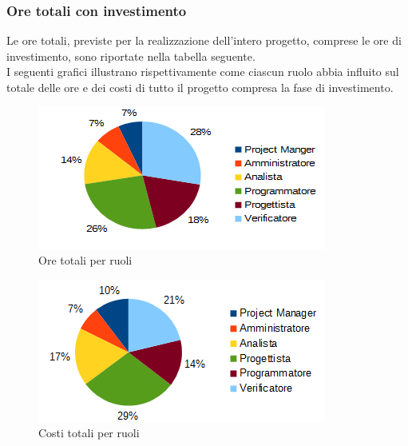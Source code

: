 		\subsubsection{Ore totali con investimento}
		Le ore totali, previste per la realizzazione dell'intero progetto, comprese le ore di investimento, sono riportate nella tabella seguente. \\
		I seguenti grafici illustrano rispettivamente come ciascun ruolo abbia influito sul totale delle ore e dei costi di tutto il progetto compresa la fase di investimento.
		\begin{figure}[htbp]
		\centering
			\includegraphics[scale=1]{immagini/grafici/riepilogo_conclusivo-torta.png}
			\caption{Ore totali per ruoli}
		\end{figure}
		\begin{figure}[htbp]
			\centering
			\includegraphics[scale=1]{immagini/grafici/riepilogo_conclusivo-torta-costo.png}
			\caption{Costi totali per ruoli}
		\end{figure}

